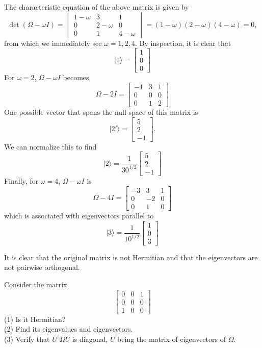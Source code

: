 \documentclass[../principles-of-quantum-mechanics.tex]{subfiles}
\begin{document}
\begin{questions}
\begin{solution}
		The characteristic equation of the above matrix is given by
		\[
			\det(\Omega - \omega{I})=\begin{vmatrix}1 - \omega & 3 & 1 \\ 0 & 2 - \omega & 0 \\ 0 & 1 & 4 - \omega\end{vmatrix} = (1-\omega)(2-\omega)(4-\omega) = 0,
		\]
		from which we immediately see $\omega=1, 2, 4$. By inspection, it is clear that \\
		\[
			|1\rangle=\begin{bmatrix}1 \\ 0 \\ 0\end{bmatrix}
		\]
		For $\omega = 2$, $\Omega-\omega{I}$ becomes
		\[
			\Omega - 2I = \begin{bmatrix}-1 & 3 & 1 \\ 0 & 0 & 0 \\ 0 & 1 & 2\end{bmatrix}
		\]
		One possible vector that spans the null space of this matrix is
		\[
			|2'\rangle = \begin{bmatrix}5 \\ 2 \\ -1\end{bmatrix}.
		\]
		We can normalize this to find
		\[
			|2\rangle = \frac{1}{30^{1/2}}\begin{bmatrix}5 \\ 2 \\ -1\end{bmatrix}
		\]
		Finally, for $\omega=4$, $\Omega - \omega{I}$ is
		\[
			\Omega - 4I = \begin{bmatrix}-3 & 3 & 1 \\ 0 & -2 & 0 \\ 0 & 1 & 0\end{bmatrix}
		\]
		which is associated with eigenvectors parallel to
		\[
			|3\rangle = \frac{1}{10^{1/2}}\begin{bmatrix}1 \\ 0 \\ 3\end{bmatrix}
		\]
		
		It is clear that the original matrix is not Hermitian and that the eigenvectors are not pairwise orthogonal.
\end{solution}

\question Consider the matrix
\[
	\begin{bmatrix}0 & 0 & 1 \\ 0 & 0 & 0 \\ 1 & 0 & 0\end{bmatrix}
\]
(1) Is it Hermitian? \\
(2) Find its eigenvalues and eigenvectors. \\
(3) Verify that $U^\dagger\Omega{U}$ is diagonal, $U$ being the matrix of eigenvectors of $\Omega$.


\end{questions}
\end{document}

